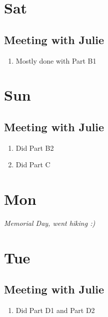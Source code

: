 \documentclass[12pt,letterpaper]{article}
\begin{document}
\section{Sat}
\subsection{Meeting with Julie}
\begin{enumerate}
  \item Mostly done with Part B1
\end{enumerate}


\section{Sun}
\subsection{Meeting with Julie}
\begin{enumerate}
  \item Did Part B2
  \item Did Part C
\end{enumerate}

\section{Mon}
\textit{Memorial Day, went hiking :)}

\section{Tue}
\subsection{Meeting with Julie}
\begin{enumerate}
  \item Did Part D1 and Part D2
\end{enumerate}
\end{document}
